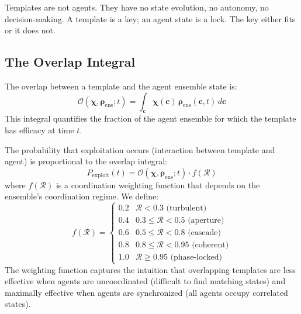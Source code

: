 \documentclass[11pt,twocolumn,a4paper]{article}
\newcommand{\Template}{\boldsymbol{\chi}}
\newcommand{\State}{\boldsymbol{\rho}}
\newcommand{\Coord}{\mathcal{R}}
\newcommand{\Overlap}{\mathcal{O}}
\begin{document}
\begin{remark}
Templates are not agents. They have no state evolution, no autonomy, no decision-making. A template is a key; an agent state is a lock. The key either fits or it does not.
\end{remark}

\subsection{The Overlap Integral}

\begin{definition}
The overlap between a template and the agent ensemble state is:
\begin{equation}
\Overlap(\Template, \State_{\mathrm{ens}}; t) = \int_{\mathbf{c}} \Template(\mathbf{c}) \, \State_{\mathrm{ens}}(\mathbf{c}, t) \, d\mathbf{c}
\label{eq:overlap_integral}
\end{equation}
This integral quantifies the fraction of the agent ensemble for which the template has efficacy at time $t$.
\end{definition}

\begin{definition}
The probability that exploitation occurs (interaction between template and agent) is proportional to the overlap integral:
\begin{equation}
P_{\mathrm{exploit}}(t) = \Overlap(\Template, \State_{\mathrm{ens}}; t) \cdot f(\Coord)
\label{eq:exploit_prob}
\end{equation}
where $f(\Coord)$ is a coordination weighting function that depends on the ensemble's coordination regime. We define:
\begin{equation}
f(\Coord) = \begin{cases}
0.2 & \Coord < 0.3 \text{ (turbulent)} \\
0.4 & 0.3 \le \Coord < 0.5 \text{ (aperture)} \\
0.6 & 0.5 \le \Coord < 0.8 \text{ (cascade)} \\
0.8 & 0.8 \le \Coord < 0.95 \text{ (coherent)} \\
1.0 & \Coord \ge 0.95 \text{ (phase-locked)}
\end{cases}
\label{eq:coordination_weighting}
\end{equation}
The weighting function captures the intuition that overlapping templates are less effective when agents are uncoordinated (difficult to find matching states) and maximally effective when agents are synchronized (all agents occupy correlated states).
\end{definition}
\end{document}

